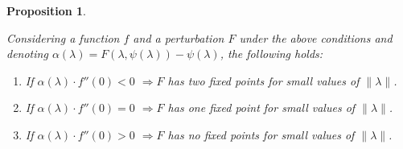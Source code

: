 \documentclass[12pt,a4paper]{report}
\newtheorem{proposicion}{Proposition}[section]
\theoremstyle{definition}
\begin{document}
\begin{proposicion}\label{Prop3}

Considering a function $f$ and a perturbation $F$ under the above conditions and denoting $\alpha(\lambda) = F(\lambda,\psi(\lambda)) - \psi(\lambda)$, the following holds:

\begin{enumerate} 

\item If $\alpha(\lambda) \cdot f''(0) < 0 $ $\Rightarrow  F$ has two fixed points for small values of $\|\lambda\|$.

\item If $\alpha(\lambda) \cdot f''(0) = 0 $ $\Rightarrow  F$ has one fixed point for small values of $\|\lambda\|$.

\item If $\alpha(\lambda) \cdot f''(0) > 0 $ $\Rightarrow  F$ has no fixed points for small values of $\|\lambda\|$.

\end{enumerate}
\end{proposicion}
\end{document}
